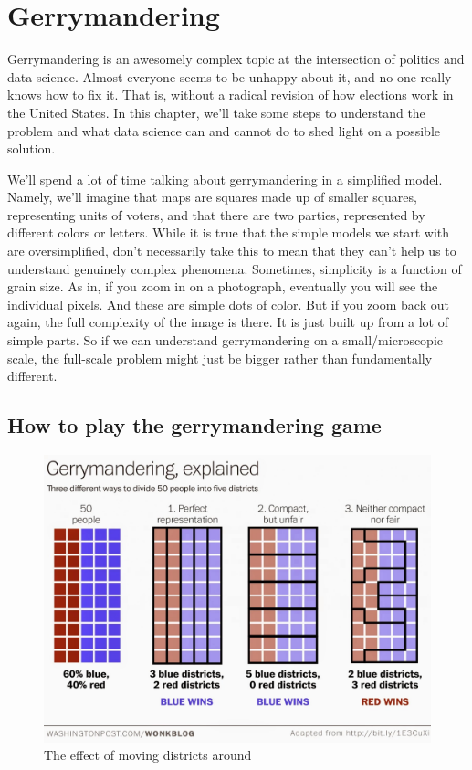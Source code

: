 \documentclass[
  openany]{book}
\begin{document}
\hypertarget{gerrymandering}{%
\chapter{Gerrymandering}\label{gerrymandering}}

Gerrymandering is an awesomely complex topic at the intersection of politics and data science. Almost everyone seems to be unhappy about it, and no one really knows how to fix it. That is, without a radical revision of how elections work in the United States. In this chapter, we'll take some steps to understand the problem and what data science can and cannot do to shed light on a possible solution.

We'll spend a lot of time talking about gerrymandering in a simplified model. Namely, we'll imagine that maps are squares made up of smaller squares, representing units of voters, and that there are two parties, represented by different colors or letters. While it is true that the simple models we start with are oversimplified, don't necessarily take this to mean that they can't help us to understand genuinely complex phenomena. Sometimes, simplicity is a function of grain size. As in, if you zoom in on a photograph, eventually you will see the individual pixels. And these are simple dots of color. But if you zoom back out again, the full complexity of the image is there. It is just built up from a lot of simple parts. So if we can understand gerrymandering on a small/microscopic scale, the full-scale problem might just be bigger rather than fundamentally different.

\hypertarget{how-to-play-the-gerrymandering-game}{%
\section*{How to play the gerrymandering game}\label{how-to-play-the-gerrymandering-game}}

\begin{figure}

{\centering \includegraphics[width=0.9\linewidth]{images/gerrymandering_simple}

}

\caption{The effect of moving districts around}\label{fig:gerrymandering-simple}
\end{figure}
\end{document}
